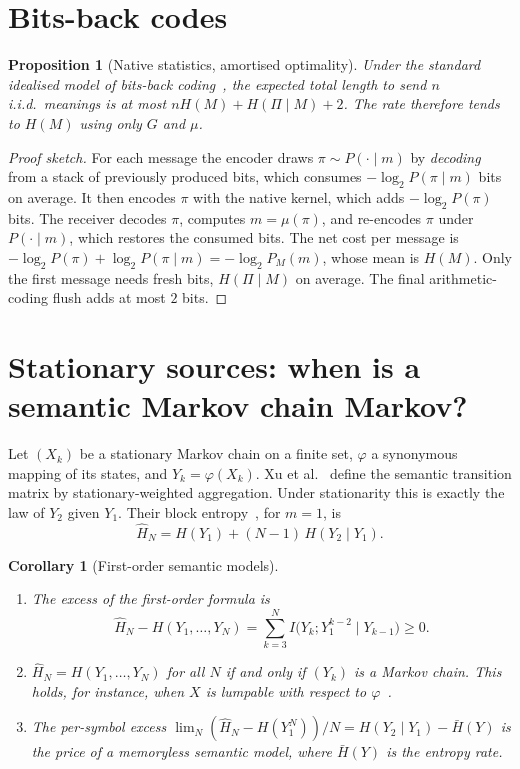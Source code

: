 \documentclass[11pt]{article}
\newtheorem{proposition}{Proposition}
\newtheorem{corollary}{Corollary}
\theoremstyle{definition}
\theoremstyle{remark}
\begin{document}
\section{Bits-back codes}

\begin{proposition}[Native statistics, amortised optimality]\label{prop:bb}
Under the standard idealised model of bits-back coding~\cite{hinton1993,frey1997}, the expected total length to send $n$ i.i.d.\ meanings is at most $nH(M)+H(\Pi\mid M)+2$. The rate therefore tends to $H(M)$ using only $G$ and $\mu$.
\end{proposition}

\begin{proof}[Proof sketch]
For each message the encoder draws $\pi\sim P(\cdot\mid m)$ by \emph{decoding} from a stack of previously produced bits, which consumes $-\log_2P(\pi\mid m)$ bits on average. It then encodes $\pi$ with the native kernel, which adds $-\log_2P(\pi)$ bits. The receiver decodes $\pi$, computes $m=\mu(\pi)$, and re-encodes $\pi$ under $P(\cdot\mid m)$, which restores the consumed bits. The net cost per message is $-\log_2P(\pi)+\log_2P(\pi\mid m)=-\log_2P_M(m)$, whose mean is $H(M)$. Only the first message needs fresh bits, $H(\Pi\mid M)$ on average. The final arithmetic-coding flush adds at most $2$ bits.
\end{proof}

\section{Stationary sources: when is a semantic Markov chain Markov?}

Let $(X_k)$ be a stationary Markov chain on a finite set, $\varphi$ a synonymous mapping of its states, and $Y_k=\varphi(X_k)$. Xu et al.~\cite[Def.~1]{xu2025} define the semantic transition matrix by stationary-weighted aggregation. Under stationarity this is exactly the law of $Y_2$ given $Y_1$. Their block entropy~\cite[Thm.~3]{xu2025}, for $m=1$, is
\[
\widehat H_N=H(Y_1)+(N-1)\,H(Y_2\mid Y_1).
\]

\begin{corollary}[First-order semantic models]\label{cor:xu}
\begin{enumerate}
\item[(a)] The excess of the first-order formula is
\[
\widehat H_N-H(Y_1,\dots,Y_N)=\sum_{k=3}^{N}I\bigl(Y_k;Y_1^{k-2}\mid Y_{k-1}\bigr)\ge0.
\]
\item[(b)] $\widehat H_N=H(Y_1,\dots,Y_N)$ for all $N$ if and only if $(Y_k)$ is a Markov chain. This holds, for instance, when $X$ is lumpable with respect to $\varphi$~\cite{geiger2014}.
\item[(c)] The per-symbol excess $\lim_N(\widehat H_N-H(Y_1^N))/N=H(Y_2\mid Y_1)-\bar H(Y)$ is the price of a memoryless semantic model, where $\bar H(Y)$ is the entropy rate.
\end{enumerate}
\end{corollary}
\end{document}
